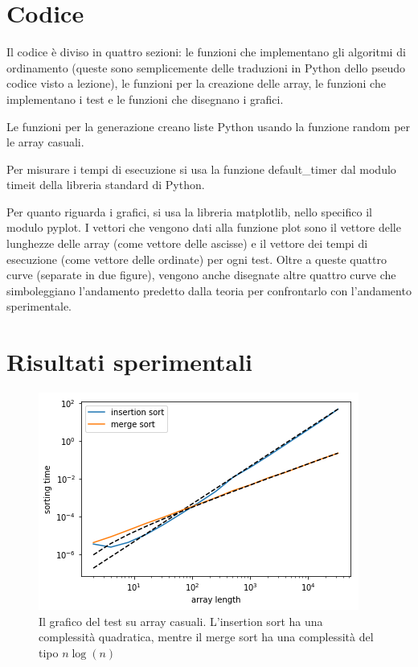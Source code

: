 \documentclass{article}
\begin{document}
\section{Codice}

Il codice è diviso in quattro sezioni: le funzioni che implementano gli algoritmi di ordinamento (queste sono semplicemente delle traduzioni in Python dello pseudo codice visto a lezione), le funzioni per la creazione delle array, le funzioni che implementano i test e le funzioni che disegnano i grafici.

Le funzioni per la generazione creano liste Python usando la funzione random per le array casuali.

Per misurare i tempi di esecuzione si usa la funzione default\_timer dal modulo timeit della libreria standard di Python.

Per quanto riguarda i grafici, si usa la libreria matplotlib, nello specifico il modulo pyplot. I vettori che vengono dati alla funzione plot sono il vettore delle lunghezze delle array (come vettore delle ascisse) e il vettore dei tempi di esecuzione (come vettore delle ordinate) per ogni test. Oltre a queste quattro curve (separate in due figure), vengono anche disegnate altre quattro curve che simboleggiano l'andamento predetto dalla teoria per confrontarlo con l'andamento sperimentale.

\section{Risultati sperimentali}

\begin{figure}[ht]
    \centering
    \includegraphics{random}
    \caption{Il grafico del test su array casuali. L'insertion sort ha una complessità quadratica, mentre il merge sort ha una complessità del tipo $n\log(n)$}
    \label{fig:random}
\end{figure}
\end{document}
